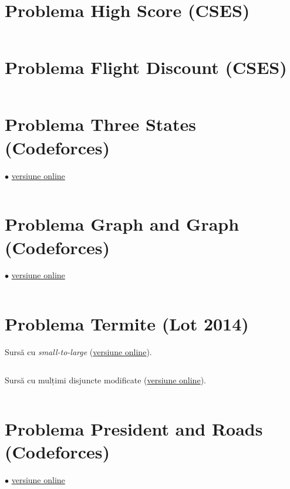 \documentclass[../main.tex]{subfiles}
\begin{document}
\inputminted{cpp}{../src/graphs/shortest-routes-2.cpp}

\section{Problema High Score (CSES)}
\label{code:high-score}

\inputminted{cpp}{../src/graphs/high-score.cpp}

\section{Problema Flight Discount (CSES)}
\label{code:flight-discount}

\inputminted{cpp}{../src/graphs/flight-discount.cpp}

\section{Problema Three States (Codeforces)}
\label{code:three-states}
$\bullet$
\href{https://codeforces.com/contest/590/submission/243684753}{versiune online}

\inputminted{cpp}{../src/graphs/three-states.cpp}

\section{Problema Graph and Graph (Codeforces)}
\label{code:graph-and-graph}
$\bullet$
\href{https://codeforces.com/contest/2059/submission/309632924}{versiune online}

\inputminted{cpp}{../src/graphs/graph-and-graph.cpp}

\section{Problema Termite (Lot 2014)}
\label{code:termite}

Sursă cu \textit{small-to-large} (\href{https://kilonova.ro/submissions/1025487}{versiune online}).

\inputminted{cpp}{../src/graphs/termite-small-to-large.cpp}

Sursă cu mulțimi disjuncte modificate (\href{https://kilonova.ro/submissions/1025539}{versiune online}).

\inputminted{cpp}{../src/graphs/termite-disjoint-sets.cpp}

\section{Problema President and Roads (Codeforces)}
\label{code:president-and-roads}
$\bullet$
\href{https://codeforces.com/contest/567/submission/363747865}{versiune online}
\end{document}
